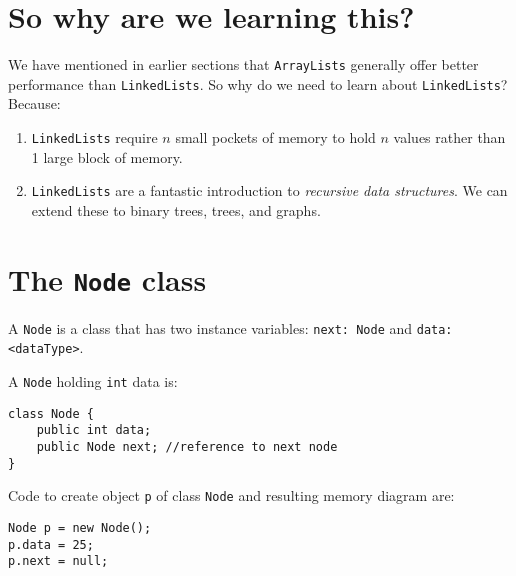 \def\topic{Linked Lists}

 
\section{So why are we learning this?}

We have mentioned in earlier sections that \texttt{ArrayLists} generally offer better performance than \texttt{LinkedLists}. So why do we need to learn about \texttt{LinkedLists}? Because:

\begin{enumerate}
\item \texttt{LinkedLists} require $n$ small pockets of memory to hold $n$ values rather than 1 large block of memory.
\item \texttt{LinkedLists} are a fantastic introduction to \textit{recursive data structures}. We can extend these to binary trees, trees, and graphs.
\end{enumerate}

\section{The \texttt{Node} class}

A \texttt{Node} is a class that has two instance variables: \texttt{next: Node} and \texttt{data: <dataType>}. 

A \texttt{Node} holding \texttt{int} data is:

\begin{lstlisting}
class Node {
	public int data;
	public Node next; //reference to next node
}
\end{lstlisting}

Code to create object \texttt{p} of class \texttt{Node} and resulting memory diagram are:

\begin{lstlisting}
Node p = new Node();
p.data = 25;
p.next = null;
\end{lstlisting}


\begin{center}
\bgroup \tikzset{png export}  \egroup
\end{center}

